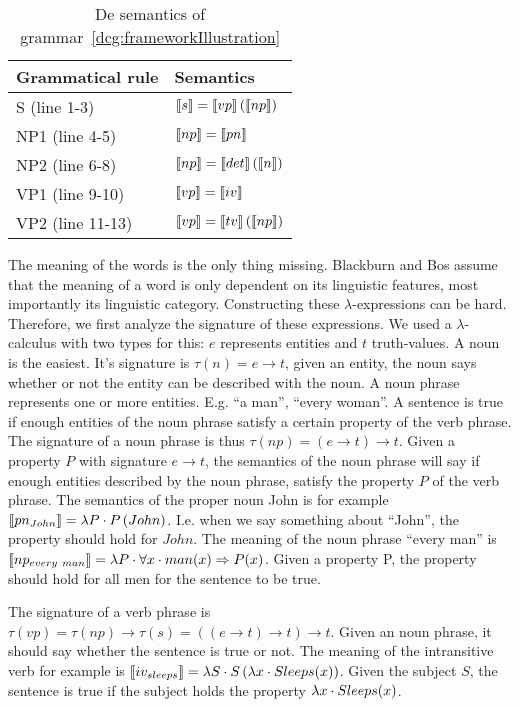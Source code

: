 \begin{table}[h]
  \begin{tabular}{@{}ll}
    \hline
    \textbf{Grammatical rule} & \textbf{Semantics} \\
    \hline
    S (line 1-3) & $\llbracket s \rrbracket = \llbracket vp \rrbracket \left( \llbracket np \rrbracket \right)$ \\
    NP1 (line 4-5) & $\llbracket np \rrbracket = \llbracket pn \rrbracket$ \\
    NP2 (line 6-8) & $\llbracket np \rrbracket = \llbracket det \rrbracket \left( \llbracket n \rrbracket \right)$ \\
    VP1 (line 9-10) & $\llbracket vp \rrbracket = \llbracket iv \rrbracket$ \\
    VP2 (line 11-13) & $\llbracket vp \rrbracket = \llbracket tv \rrbracket \left( \llbracket np \rrbracket \right)$\\
    \hline
  \end{tabular}
  \centering
  \caption{De semantics of grammar~\ref{dcg:frameworkIllustration}}
  \label{tbl:grammar-sem}
\end{table}

The meaning of the words is the only thing missing. Blackburn and Bos assume that the meaning of a word is only dependent on its linguistic features, most importantly its linguistic category. Constructing these $\lambda$-expressions can be hard. Therefore, we first analyze the signature of these expressions. We used a $\lambda$-calculus with two types for this: $e$ represents entities and $t$ truth-values. A noun is the easiest. It's signature is $\tau(n) = e \rightarrow t$, given an entity, the noun says whether or not the entity can be described with the noun. A noun phrase represents one or more entities. E.g. ``a man'', ``every woman''. A sentence is true if enough entities of the noun phrase satisfy a certain property of the verb phrase. The signature of a noun phrase is thus $\tau(np) = (e \rightarrow t) \rightarrow t$. Given a property $P$ with signature $e \rightarrow t$, the semantics of the noun phrase will say if enough entities described by the noun phrase, satisfy the property $P$ of the verb phrase. The semantics of the proper noun John is for example $\llbracket pn_{John} \rrbracket = \lambda P \cdot P \left( John \right)$. I.e. when we say something about ``John'', the property should hold for $John$. The meaning of the noun phrase ``every man'' is $\llbracket np_{every\ man} \rrbracket = \lambda P \cdot \forall x \cdot man(x) \Rightarrow P(x)$. Given a property P, the property should hold for all men for the sentence to be true.

The signature of a verb phrase is $\tau(vp) = \tau(np) \rightarrow \tau(s) = ((e \rightarrow t) \rightarrow t) \rightarrow t$. Given an noun phrase, it should say whether the sentence is true or not. The meaning of the intransitive verb for example is $\llbracket iv_{sleeps} \rrbracket = \lambda S \cdot S \left( \lambda x \cdot Sleeps(x) \right)$. Given the subject $S$, the sentence is true if the subject holds the property $\lambda x \cdot Sleeps(x)$.


